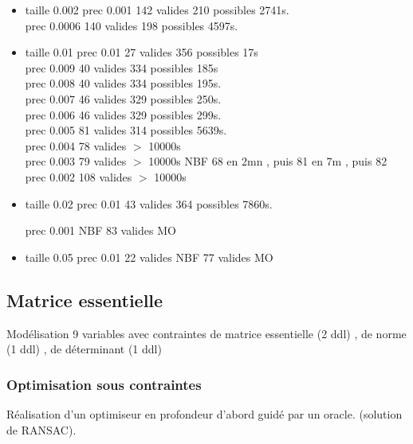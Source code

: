 \documentclass{article}
\begin{document}
\begin {itemize}
\item {taille 0.002}
          prec 0.001   142 valides      210 possibles  2741s.  \\
          prec 0.0006  140 valides      198 possibles   4597s. \\

\item{taille 0.01}
         prec 0.01     27 valides      356 possibles   17s  \\
         prec 0.009    40 valides      334 possibles  185s  \\
         prec 0.008    40 valides      334 possibles  195s. \\
         prec 0.007    46 valides      329 possibles  250s. \\
         prec 0.006    46 valides      329 possibles  299s.  \\
         prec 0.005    81 valides      314 possibles 5639s. \\
         prec 0.004    78 valides      $>$ 10000s    \\
         prec 0.003    79 valides      $>$ 10000s   NBF 68 en 2mn , puis 81 en 7m , puis 82   \\
         prec 0.002   108 valides      $>$ 10000s\\

\item{taille 0.02}
         prec 0.01     43 valides       364 possibles 7860s.   

         prec 0.001    NBF 83 valides   MO \\

\item{taille 0.05}
         prec 0.01      22 valides       NBF 77 valides  MO\\

\end{itemize}

\subsection{Matrice essentielle}

Mod\'elisation 9 variables avec contraintes de matrice essentielle (2 ddl) , de norme (1 ddl) , de d\'eterminant (1 ddl)

\subsubsection {Optimisation sous contraintes}

R\'ealisation d'un optimiseur en profondeur d'abord guid\'e par un oracle. (solution de RANSAC).
\end{document}
